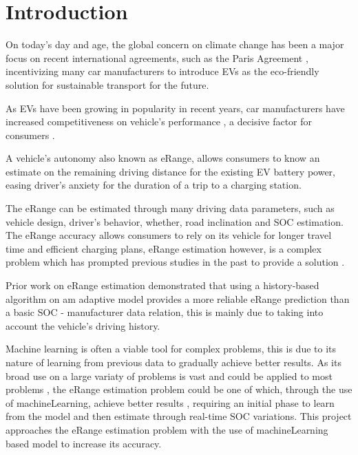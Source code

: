 \chapter{Introduction}
\label{cha:introduction}

On today's day and age, the global concern on climate
change has been a major focus on recent international agreements,
such as the Paris Agreement \citep{parisAgreement},
incentivizing many car manufacturers to introduce
\gls{EVs} as the eco-friendly
solution for sustainable transport for the future.

As \gls{EVs} have been growing in popularity in
recent years, car manufacturers have
increased competitiveness on vehicle's performance
\citep{evCompetitiveness}, a decisive factor 
for consumers \citep{EGBUE2012717}.

A vehicle's autonomy also known as \gls{eRange},
allows consumers to know an estimate on the
remaining driving distance for the existing \gls{EV}
battery power, easing driver's anxiety for the duration
of a trip to a charging station.

The \gls{eRange} can be estimated through many
driving data parameters,
such as vehicle design, driver's behavior, whether,
road inclination and \gls{SOC} estimation.
The \gls{eRange} accuracy allows consumers to rely
on its vehicle for longer travel time and efficient
charging plans, \gls{eRange} estimation
however, is a complex problem which has prompted
previous studies in the past to provide a solution 
\citep{classicEVX, predictionOfeRange}.

\vbox {
    Prior work \citep{classicEVX} on \gls{eRange}
    estimation demonstrated that using a
    history-based algorithm on am adaptive model
    provides a more reliable \gls{eRange} prediction
    than a basic \gls{SOC} - manufacturer data relation,
    this is mainly due to taking into account the
    vehicle's driving history.
}

Machine learning is often a viable tool for complex
problems, this is due to its nature of 
learning from previous data to 
gradually achieve better results.
As its broad use on a large variaty of problems 
is vast and could be applied to most problems
\citep{mitchelllearning}, the \gls{eRange}
 estimation problem could be one of which, 
through the use of \gls{machineLearning}, 
achieve better results \cite{predictionOfeRange},
requiring an initial phase to learn from 
the model and then estimate through real-time \gls{SOC} variations.
This project approaches the \gls{eRange} estimation
problem with the use of \gls{machineLearning} based
model to increase its accuracy.

